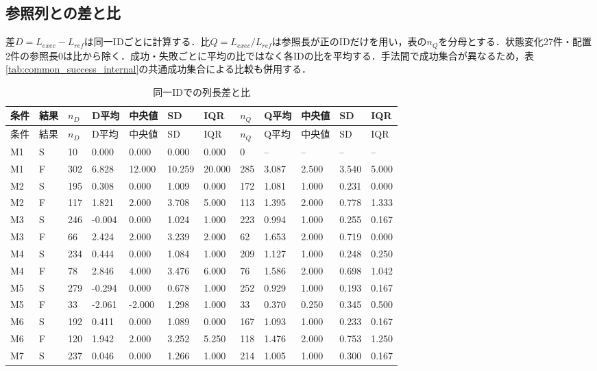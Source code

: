 \subsection{参照列との差と比}
差$D=L_{exec}-L_{ref}$は同一IDごとに計算する．比$Q=L_{exec}/L_{ref}$は参照長が正のIDだけを用い，表の$n_Q$を分母とする．状態変化27件・配置2件の参照長0は比から除く．成功・失敗ごとに平均の比ではなく各IDの比を平均する．手法間で成功集合が異なるため，表\ref{tab:common_success_internal}の共通成功集合による比較も併用する．

{\scriptsize\setlength{\tabcolsep}{3pt}
\begin{longtable}{llllllllllll}
\caption{同一IDでの列長差と比}\label{tab:length_ratios}\\
\hline
条件 & 結果 & $n_D$ & D平均 & 中央値 & SD & IQR & $n_Q$ & Q平均 & 中央値 & SD & IQR\\\hline\endfirsthead
条件 & 結果 & $n_D$ & D平均 & 中央値 & SD & IQR & $n_Q$ & Q平均 & 中央値 & SD & IQR\\\hline\endhead
\hline\endfoot
M1 & S & 10 & 0.000 & 0.000 & 0.000 & 0.000 & 0 & -- & -- & -- & -- \\
M1 & F & 302 & 6.828 & 12.000 & 10.259 & 20.000 & 285 & 3.087 & 2.500 & 3.540 & 5.000 \\
M2 & S & 195 & 0.308 & 0.000 & 1.009 & 0.000 & 172 & 1.081 & 1.000 & 0.231 & 0.000 \\
M2 & F & 117 & 1.821 & 2.000 & 3.708 & 5.000 & 113 & 1.395 & 2.000 & 0.778 & 1.333 \\
M3 & S & 246 & -0.004 & 0.000 & 1.024 & 1.000 & 223 & 0.994 & 1.000 & 0.255 & 0.167 \\
M3 & F & 66 & 2.424 & 2.000 & 3.239 & 2.000 & 62 & 1.653 & 2.000 & 0.719 & 0.000 \\
M4 & S & 234 & 0.444 & 0.000 & 1.084 & 1.000 & 209 & 1.127 & 1.000 & 0.248 & 0.250 \\
M4 & F & 78 & 2.846 & 4.000 & 3.476 & 6.000 & 76 & 1.586 & 2.000 & 0.698 & 1.042 \\
M5 & S & 279 & -0.294 & 0.000 & 0.678 & 1.000 & 252 & 0.929 & 1.000 & 0.193 & 0.167 \\
M5 & F & 33 & -2.061 & -2.000 & 1.298 & 1.000 & 33 & 0.370 & 0.250 & 0.345 & 0.500 \\
M6 & S & 192 & 0.411 & 0.000 & 1.089 & 0.000 & 167 & 1.093 & 1.000 & 0.233 & 0.167 \\
M6 & F & 120 & 1.942 & 2.000 & 3.252 & 5.250 & 118 & 1.476 & 2.000 & 0.753 & 1.250 \\
M7 & S & 237 & 0.046 & 0.000 & 1.266 & 1.000 & 214 & 1.005 & 1.000 & 0.300 & 0.167 \\

\end{longtable}}
